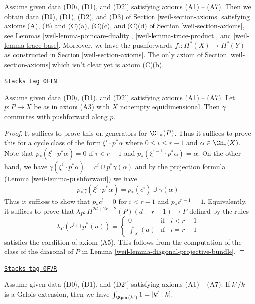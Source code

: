 Assume given data (D0), (D1), and (D2') satisfying axioms (A1) -- (A7).
Then we obtain data (D0), (D1), (D2), and (D3) of
Section \ref{weil-section-axioms}
satisfying axioms (A), (B) and (C)(a), (C)(c), and (C)(d)
of Section \ref{weil-section-axioms}, see
Lemmas \ref{weil-lemma-poincare-duality}, \ref{weil-lemma-trace-product}, and
\ref{weil-lemma-trace-base}.
Moreover, we have the pushforwards $f_* : H^*(X) \to H^*(Y)$
as constructed in Section \ref{weil-section-axioms}. The only axiom of
Section \ref{weil-section-axioms}
which isn't clear yet is axiom (C)(b).

\begin{lemma}
\label{weil-lemma-ok-for-projective-bundle}
\href{https://stacks.math.columbia.edu/tag/0FIN}{\texttt{Stacks tag 0FIN}}

Assume given data (D0), (D1), and (D2') satisfying axioms (A1) -- (A7).
Let $p : P \to X$ be as in axiom (A3) with $X$ nonempty equidimensional.
Then $\gamma$ commutes with pushforward along $p$.
\end{lemma}

\begin{proof}

It suffices to prove this on generators for $\CH_*(P)$.
Thus it suffices to prove this for a cycle class of the
form $\xi^i \cdot p^*\alpha$ where $0 \leq i \leq r - 1$
and $\alpha \in \CH_*(X)$. Note that $p_*(\xi^i \cdot p^*\alpha) = 0$
if $i < r - 1$ and $p_*(\xi^{r - 1} \cdot p^*\alpha) = \alpha$.
On the other hand, we have
$\gamma(\xi^i \cdot p^*\alpha) = c^i \cup p^*\gamma(\alpha)$
and by the projection formula (Lemma \ref{weil-lemma-pushforward})
we have
$$
p_*\gamma(\xi^i \cdot p^*\alpha) = p_*(c^i) \cup \gamma(\alpha)
$$
Thus it suffices to show that $p_*c^i = 0$ for $i < r - 1$ and
$p_*c^{r - 1} = 1$. Equivalently, it suffices to prove that
$\lambda_P : H^{2d + 2r - 2}(P)(d + r - 1) \to F$ defined by
the rules
$$
\lambda_P(c^i \cup p^*(a)) =
\left\{
\begin{matrix}
0 & \text{if} & i < r - 1 \\
\int_X(a) & \text{if} & i = r - 1
\end{matrix}
\right.
$$
satisfies the condition of axiom (A5). This follows from the
computation of the class of the diagonal of $P$ in
Lemma \ref{weil-lemma-diagonal-projective-bundle}.
\end{proof}

\begin{lemma}[Integrate 1]
\label{weil-lemma-integrate-1}
\href{https://stacks.math.columbia.edu/tag/0FVR}{\texttt{Stacks tag 0FVR}}

Assume given data (D0), (D1), and (D2') satisfying axioms (A1) -- (A7).
If $k'/k$ is a Galois extension, then we have
$\int_{\Spec(k')} 1 = [k' : k]$.
\end{lemma}

